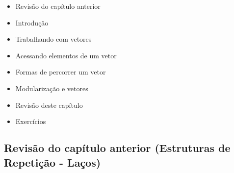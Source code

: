 \documentclass[12pt,a4paper]{article}
\providecommand{\tightlist}{%
      \setlength{\itemsep}{0pt}\setlength{\parskip}{0pt}}
\begin{document}
\begin{itemize}
\tightlist
\item
  Revisão do capítulo anterior
\item
  Introdução
\item
  Trabalhando com vetores
\item
  Acessando elementos de um vetor
\item
  Formas de percorrer um vetor
\item
  Modularização e vetores
\item
  Revisão deste capítulo
\item
  Exercícios
\end{itemize}

    \hypertarget{revisuxe3o-do-capuxedtulo-anterior-estruturas-de-repetiuxe7uxe3o---lauxe7os}{%
\subsection{Revisão do capítulo anterior (Estruturas de Repetição -
Laços)}\label{revisuxe3o-do-capuxedtulo-anterior-estruturas-de-repetiuxe7uxe3o---lauxe7os}}
\end{document}
